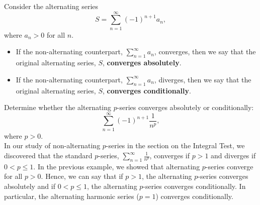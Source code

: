 \documentclass[handout]{ximera}
\begin{document}
\begin{definition}
Consider the alternating series
\[
S = \sum_{n=1}^\infty (-1)^{n+1} a_n,
\]
where $a_n > 0$ for all $n$.
\begin{itemize}
\item If the non-alternating counterpart, $\displaystyle{\sum_{n=1}^\infty a_n}$, converges, then we say that the original alternating series, $S$,
\textbf{converges absolutely}.
\item If the non-alternating counterpart, $\displaystyle{\sum_{n=1}^\infty  a_n}$, diverges, then we say that the original alternating series, $S$,  
\textbf{converges conditionally}.
\end{itemize}

\end{definition}

\begin{example}[example 3]
Determine whether the alternating $p$-series converges absolutely or conditionally:
\[
\sum_{n=1}^\infty (-1)^{n+1} \frac{1}{n^p},
\]
where $p > 0$.\\
 In our study of non-alternating $p$-series in the section on the Integral Test, we 
discovered that the standard $p$-series, $\displaystyle{\sum_{n=1}^\infty \frac{1}{n^p}}$, 
converges if $p>1$ and diverges if $0 < p \leq 1$.
In the previous example, we showed that alternating $p$-series converge for all $p>0$. 
Hence, we can say that 
if $p>1$, the alternating $p$-series converges absolutely and if $0<p\leq 1$, 
the alternating $p$-series converges conditionally. In particular, the alternating harmonic series ($p = 1$) converges conditionally.
\end{example}
\end{document}
